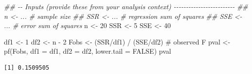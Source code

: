 \documentclass[
  letterpaper,
]{scrbook}
\newenvironment{Shaded}{\begin{snugshade}}{\end{snugshade}}
\newcommand{\AttributeTok}[1]{\textcolor[rgb]{0.40,0.45,0.13}{#1}}
\newcommand{\CommentTok}[1]{\textcolor[rgb]{0.37,0.37,0.37}{#1}}
\newcommand{\ConstantTok}[1]{\textcolor[rgb]{0.56,0.35,0.01}{#1}}
\newcommand{\DecValTok}[1]{\textcolor[rgb]{0.68,0.00,0.00}{#1}}
\newcommand{\DocumentationTok}[1]{\textcolor[rgb]{0.37,0.37,0.37}{\textit{#1}}}
\newcommand{\FunctionTok}[1]{\textcolor[rgb]{0.28,0.35,0.67}{#1}}
\newcommand{\NormalTok}[1]{\textcolor[rgb]{0.00,0.23,0.31}{#1}}
\newcommand{\OtherTok}[1]{\textcolor[rgb]{0.00,0.23,0.31}{#1}}
\newcommand{\SpecialCharTok}[1]{\textcolor[rgb]{0.37,0.37,0.37}{#1}}
\begin{document}
\begin{Shaded}
\begin{Highlighting}[]
\DocumentationTok{\#\# {-}{-} Inputs (provide these from your analysis context) {-}{-}{-}{-}{-}{-}{-}{-}{-}{-}{-}{-}{-}{-}{-}{-}{-}{-}{-}{-}{-}{-}{-}{-}{-}}
\DocumentationTok{\#\# n   \textless{}{-} ...   \# sample size}
\DocumentationTok{\#\# SSR \textless{}{-} ...   \# regression sum of squares}
\DocumentationTok{\#\# SSE \textless{}{-} ...   \# error sum of squares}
\NormalTok{n   }\OtherTok{\textless{}{-}} \DecValTok{20}
\NormalTok{SSR }\OtherTok{\textless{}{-}} \DecValTok{5}
\NormalTok{SSE }\OtherTok{\textless{}{-}} \DecValTok{40}




\NormalTok{df1  }\OtherTok{\textless{}{-}} \DecValTok{1}
\NormalTok{df2  }\OtherTok{\textless{}{-}}\NormalTok{ n }\SpecialCharTok{{-}} \DecValTok{2}
\NormalTok{Fobs }\OtherTok{\textless{}{-}}\NormalTok{ (SSR}\SpecialCharTok{/}\NormalTok{df1) }\SpecialCharTok{/}\NormalTok{ (SSE}\SpecialCharTok{/}\NormalTok{df2)         }\CommentTok{\# observed F}
\NormalTok{pval }\OtherTok{\textless{}{-}} \FunctionTok{pf}\NormalTok{(Fobs, }\AttributeTok{df1 =}\NormalTok{ df1, }\AttributeTok{df2 =}\NormalTok{ df2, }\AttributeTok{lower.tail =} \ConstantTok{FALSE}\NormalTok{)}
\NormalTok{pval}
\end{Highlighting}
\end{Shaded}

\begin{verbatim}
[1] 0.1509505
\end{verbatim}
\end{document}

